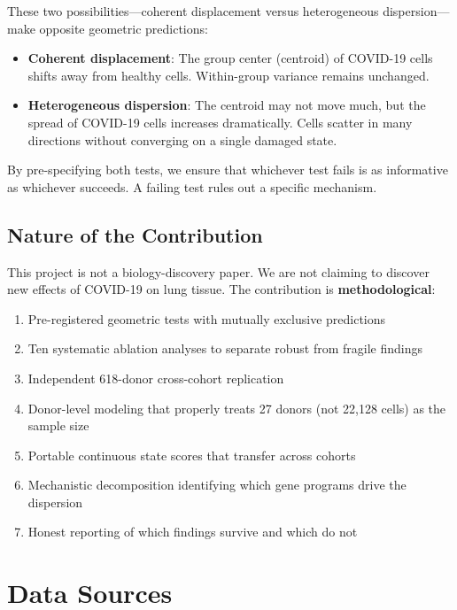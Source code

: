 \documentclass[11pt]{article}
\begin{document}
These two possibilities---coherent displacement versus heterogeneous dispersion---make opposite geometric predictions:

\begin{itemize}
\item \textbf{Coherent displacement}: The group center (centroid) of COVID-19 cells shifts away from healthy cells. Within-group variance remains unchanged.
\item \textbf{Heterogeneous dispersion}: The centroid may not move much, but the spread of COVID-19 cells increases dramatically. Cells scatter in many directions without converging on a single damaged state.
\end{itemize}

By pre-specifying both tests, we ensure that whichever test fails is as informative as whichever succeeds. A failing test rules out a specific mechanism.

\subsection{Nature of the Contribution}

This project is not a biology-discovery paper. We are not claiming to discover new effects of COVID-19 on lung tissue. The contribution is \textbf{methodological}:

\begin{enumerate}
\item Pre-registered geometric tests with mutually exclusive predictions
\item Ten systematic ablation analyses to separate robust from fragile findings
\item Independent 618-donor cross-cohort replication
\item Donor-level modeling that properly treats 27 donors (not 22,128 cells) as the sample size
\item Portable continuous state scores that transfer across cohorts
\item Mechanistic decomposition identifying which gene programs drive the dispersion
\item Honest reporting of which findings survive and which do not
\end{enumerate}


\section{Data Sources}
\end{document}
